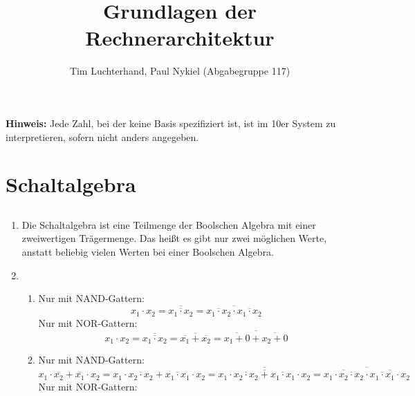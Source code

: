 \documentclass[DIN, pagenumber=false, fontsize=11pt, parskip=half]{scrartcl}
\title{Grundlagen der Rechnerarchitektur}
\author{Tim Luchterhand, Paul Nykiel (Abgabegruppe 117)}
\begin{document}
    \maketitle
    \textbf{Hinweis: } Jede Zahl, bei der keine Basis spezifiziert ist, ist im 10er System zu interpretieren, sofern nicht anders angegeben.
    \section{Schaltalgebra}
    \subsection{}
    \begin{enumerate}[label = (\alph*)]
        \item Die Schaltalgebra ist eine Teilmenge der Boolschen Algebra mit einer zweiwertigen Trägermenge. 
            Das heißt es gibt nur zwei möglichen Werte, anstatt beliebig vielen Werten bei einer Boolschen Algebra.
        \item 
            \begin{enumerate}[label = (\roman*)]
                \item 
                    Nur mit NAND-Gattern:
                    \begin{equation*}
                        x_1 \cdot x_2 = \overline{\overline{x_1 \cdot x_2}} = \overline{\overline{x_1 \cdot x_2} \cdot \overline{x_1 \cdot x_2}}
                    \end{equation*}
                    Nur mit NOR-Gattern:
                    \begin{equation*}
                        x_1 \cdot x_2 = \overline{\overline{x_1 \cdot x_2}} = \overline{\overline{x_1} + \overline{x_2}}= \overline{\overline{x_1 + 0} + \overline{x_2 + 0}}
                    \end{equation*}
                \item
                    Nur mit NAND-Gattern:
                    \begin{equation*}
                        x_1 \cdot \overline{x_2} + \overline{x_1} \cdot x_2 = x_1 \cdot \overline{x_2 \cdot x_2} + \overline{x_1 \cdot x_1} \cdot x_2  
                        = \overline{\overline{x_1 \cdot \overline{x_2 \cdot x_2} + \overline{x_1 \cdot x_1} \cdot x_2}}
                        = \overline{\overline{x_1 \cdot \overline{x_2 \cdot x_2}} \cdot \overline{ \overline{x_1 \cdot x_1} \cdot x_2}}
                    \end{equation*}
                    Nur mit NOR-Gattern:
            \end{enumerate}
    \end{enumerate}
\end{document}
